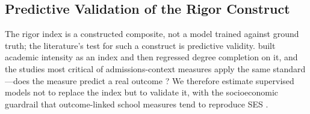 %
%

\subsection{Predictive Validation of the Rigor Construct}\label{sec:validation}

The rigor index is a constructed composite, not a model trained against ground truth; the
literature's test for such a construct is predictive validity. \citet{adelman1999,adelman2006}
built academic intensity as an index and then regressed degree completion on it, and the
studies most critical of admissions-context measures apply the same standard---does the
measure predict a real outcome \citep{geiser2004,bastedo2016}? We therefore estimate
supervised models not to replace the index but to validate it, with the socioeconomic
guardrail that outcome-linked school measures tend to reproduce SES \citep{ho2020}.

